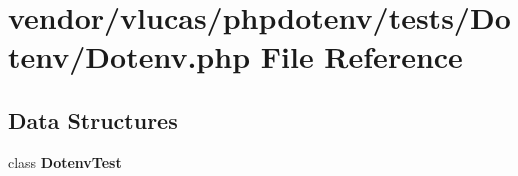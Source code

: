 \section{vendor/vlucas/phpdotenv/tests/\+Dotenv/\+Dotenv.php File Reference}
\label{tests_2_dotenv_2_dotenv_8php}
\subsection*{Data Structures}
\begin{DoxyCompactItemize}
\item 
class {\bf Dotenv\+Test}
\end{DoxyCompactItemize}
